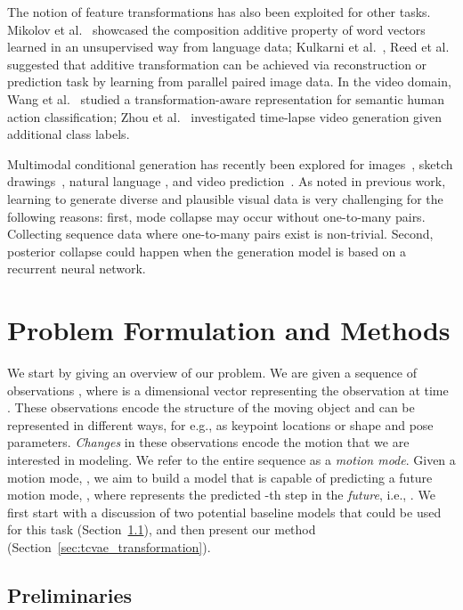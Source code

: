 \documentclass[runningheads]{llncs}
\newcommand{\cutsectionup}{\vspace*{-0.2in}}
\newcommand{\cutsectiondown}{\vspace*{-0.12in}}
\newcommand{\cutsubsectionup}{\vspace*{-0.1in}}
\newcommand{\cutsubsectiondown}{\vspace*{-0.07in}}
\begin{document}
The notion of feature transformations has also been exploited for other tasks. Mikolov et al.~\cite{mikolov2013distributed} showcased the composition additive property of word vectors learned in an unsupervised way from language data;
Kulkarni et al.~\cite{kulkarni2015deep}, Reed et al.~\cite{reed2015deep} suggested that additive transformation can be achieved via reconstruction or prediction task by learning from parallel paired image data.
In the video domain, Wang et al.~\cite{wang2016actions} studied a transformation-aware representation for semantic human action classification;
Zhou et al.~\cite{zhou2016learning} investigated time-lapse video generation given additional class labels.

Multimodal conditional generation has recently been explored for images~\cite{sohn2015learning,zhu2017toward}, sketch drawings~\cite{ha2017neural}, natural language \cite{bowman2015generating,hu2017controllable}, and video prediction~\cite{mohammad2018stochastic,denton2018stochastic}.
As noted in previous work, learning to generate diverse and plausible visual data is very challenging for the following reasons:
first, mode collapse may occur without one-to-many pairs. Collecting sequence data where one-to-many pairs exist is non-trivial.
Second, posterior collapse could happen when the generation model is based on a recurrent neural network.


\cutsectionup
\section{Problem Formulation and Methods}
\cutsectiondown
We start by giving an overview of our problem.
We are given a sequence of  observations , where  is a  dimensional vector representing the observation at time .
These observations encode the structure of the moving object and can be represented in different ways, for e.g., as keypoint locations or shape and pose parameters. 
\emph{Changes} in these observations encode the motion that we are interested in modeling.
We refer to the entire sequence as a \emph{motion mode}.
Given a motion mode, , we aim to build a model that is capable of predicting a future motion mode, , where  represents the predicted -th step in the \emph{future}, i.e., . 
We first start with a discussion of two potential baseline models that could be used for this task (Section~\ref{sec:preliminaries}), and then present our method (Section~\ref{sec:tcvae_transformation}).

\cutsubsectionup
\subsection{Preliminaries}
\label{sec:preliminaries}
\cutsubsectiondown
\end{document}
